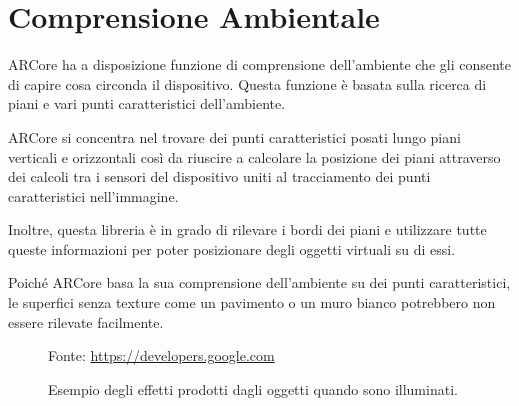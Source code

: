 \documentclass[crop=false, class=book]{standalone}
\begin{document}
	\section{Comprensione Ambientale}
	ARCore ha a disposizione funzione di comprensione dell’ambiente che gli consente di capire cosa circonda il dispositivo. Questa funzione è basata sulla ricerca di piani e vari punti caratteristici dell’ambiente.
	
	ARCore si concentra nel trovare dei punti caratteristici posati lungo piani verticali e orizzontali così da riuscire a calcolare la posizione dei piani attraverso dei calcoli tra i sensori del dispositivo uniti al tracciamento dei punti caratteristici nell’immagine. 
	
	Inoltre, questa libreria è in grado di rilevare i bordi dei piani e utilizzare tutte queste informazioni per poter posizionare degli oggetti virtuali su di essi.
	
	Poiché ARCore basa la sua comprensione dell’ambiente su dei punti caratteristici, le superfici senza texture come un pavimento o un muro bianco potrebbero non essere rilevate facilmente.

	\begin{center}
		\begin{figure}
			\centering
			{Fonte: \url{https://developers.google.com}}
			\caption{Esempio degli effetti prodotti dagli oggetti quando sono illuminati.}
			\label{fig:env_und}
		\end{figure}
	\end{center}
\end{document}
